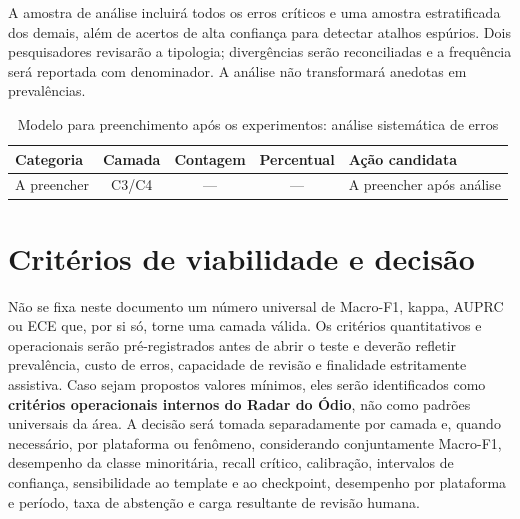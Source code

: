 A amostra de análise incluirá todos os erros críticos e uma amostra estratificada dos demais, além de acertos de alta confiança para detectar atalhos espúrios. Dois pesquisadores revisarão a tipologia; divergências serão reconciliadas e a frequência será reportada com denominador. A análise não transformará anedotas em prevalências.

\begin{table}[htbp]
\centering
\caption{Modelo para preenchimento após os experimentos: análise sistemática de erros}
\label{tab:resultados-erros}
\begin{tabular}{|p{}|c|c|c|p{}|}
\hline
\textbf{Categoria} & \textbf{Camada} & \textbf{Contagem} & \textbf{Percentual} & \textbf{Ação candidata} \\
\hline
A preencher & C3/C4 & --- & --- & A preencher após análise \\
\hline
\end{tabular}
\end{table}

\section{Critérios de viabilidade e decisão}
\label{sec:viabilidade}

Não se fixa neste documento um número universal de Macro-F1, kappa, AUPRC ou ECE que, por si só, torne uma camada válida. Os critérios quantitativos e operacionais serão pré-registrados antes de abrir o teste e deverão refletir prevalência, custo de erros, capacidade de revisão e finalidade estritamente assistiva. Caso sejam propostos valores mínimos, eles serão identificados como \textbf{critérios operacionais internos do Radar do Ódio}, não como padrões universais da área. A decisão será tomada separadamente por camada e, quando necessário, por plataforma ou fenômeno, considerando conjuntamente Macro-F1, desempenho da classe minoritária, recall crítico, calibração, intervalos de confiança, sensibilidade ao template e ao checkpoint, desempenho por plataforma e período, taxa de abstenção e carga resultante de revisão humana.

